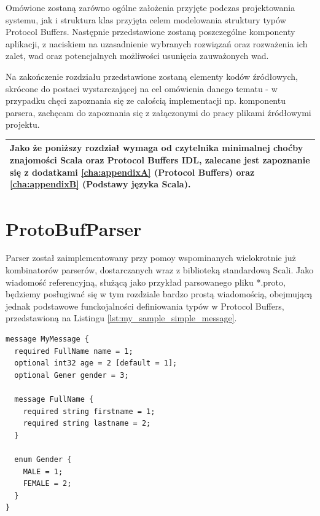 \documentclass[pdflatex,11pt]{aghdpl}
\begin{document}
Omówione zostaną zarówno ogólne założenia przyjęte podczas projektowania systemu, jak i struktura klas przyjęta celem
modelowania struktury typów Protocol Buffers. Następnie przedstawione zostaną poszczególne komponenty aplikacji, z naciskiem na uzasadnienie
wybranych rozwiązań oraz rozważenia ich zalet, wad oraz potencjalnych możliwości usunięcia zauważonych wad. 

Na zakończenie rozdziału przedstawione zostaną elementy kodów źródłowych, skrócone do postaci wystarczającej na cel omówienia danego tematu 
- w przypadku chęci zapoznania się ze całością implementacji np. komponentu parsera, zachęcam do zapoznania się 
z załączonymi do pracy plikami źródłowymi projektu.

\begin{center}
\begin{tabular}{ | p{\textwidth} | }
\hline 
Jako że poniższy rozdział wymaga od czytelnika minimalnej choćby znajomości Scala oraz Protocol Buffers IDL, zalecane jest zapoznanie się z 
dodatkami \ref{cha:appendixA} (Protocol Buffers) oraz \ref{cha:appendixB} (Podstawy języka Scala). \\ \hline
\end{tabular}
\end{center}


\section{ProtoBufParser}
\label{sec:protoBufParser}
Parser został zaimplementowany przy pomoy wspominanych wielokrotnie już kombinatorów parserów, 
dostarczanych wraz z biblioteką standardową Scali. Jako wiadomość referencyjną, służącą jako przykład parsowanego pliku *.proto, 
będziemy posługiwać się w tym rozdziale bardzo prostą wiadomością, obejmującą jednak podstawowe funckojalności definiowania typów
w Protocol Buffers, przedstawioną na Listingu \ref{lst:my_sample_simple_message}.

\newpage 
\begin{lstlisting}[caption={Przykład wiadomości, służący łatwiejszej wizualizacji działania parsera}, label={lst:my_sample_simple_message}]
message MyMessage {
  required FullName name = 1;
  optional int32 age = 2 [default = 1];
  optional Gener gender = 3;

  message FullName {
    required string firstname = 1;
    required string lastname = 2;
  }

  enum Gender {
    MALE = 1;
    FEMALE = 2;
  }
}
\end{lstlisting}
\end{document}
